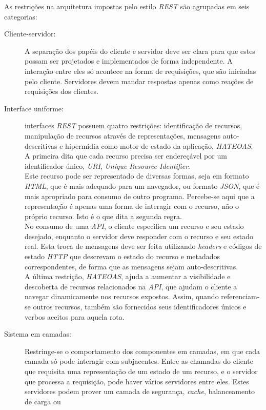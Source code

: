 As restrições na arquitetura impostas pelo estilo \emph{REST} são agrupadas em seis categorias:
\begin{description}
\item[Cliente-servidor:] A separação dos papéis do cliente e servidor deve ser clara para 
  que estes possam ser projetados e implementados de forma independente. A interação 
  entre eles só acontece na forma de requisições, que são iniciadas pelo cliente. 
  Servidores devem mandar respostas apenas como reações de requisições dos clientes.
\item[Interface uniforme:] interfaces \emph{REST} possuem quatro  restrições:
identificação de recursos, manipulação de recursos através de representações, 
mensagens auto-descritivas e hipermídia como motor de estado da aplicação, \emph{HATEOAS}.\\
A primeira dita que cada recurso precisa ser endereçável 
por um identificador único, \emph{URI}, \emph{Unique Resource Identifier}.\\
Este 
recurso pode ser representado de diversas formas, seja em formato \emph{HTML}, que é mais adequado para 
um navegador,
ou formato \emph{JSON}, que é mais apropriado para consumo de outro programa. Percebe-se aqui 
que a representação é apenas uma forma de interagir com o 
recurso,  não o próprio recurso. Isto é o que dita a segunda regra. \\
No consumo de uma \emph{API}, o cliente especifica um recurso e seu estado 
desejado, enquanto o servidor deve responder com o recurso e seu estado real. 
Esta troca de mensagens  deve ser feita utilizando \emph{headers} e 
códigos de estado \emph{HTTP} que descrevam o estado 
do recurso e metadados correspondentes, de forma que as mensagens sejam auto-descritivas.\\
A última restrição, \emph{HATEOAS}, ajuda a aumentar a visibilidade e descoberta de recursos 
relacionados na \emph{API}, que ajudam o cliente a navegar dinamicamente nos recursos expostos.
Assim, quando referenciam-se outros recursos, também são fornecidos seus identificadores únicos 
e verbos aceitos para aquela rota.
\item[Sistema em camadas:] Restringe-se o comportamento dos componentes em camadas, em que 
  cada camada só pode interagir com subjacentes. 
  Entre as chamadas do cliente que requisita uma representação de um estado de um recurso, e 
  o servidor que processa a requisição, pode haver vários servidores entre eles. Estes 
  servidores podem prover um camada de segurança, \emph{cache}, balanceamento de carga ou 

\end{description}
